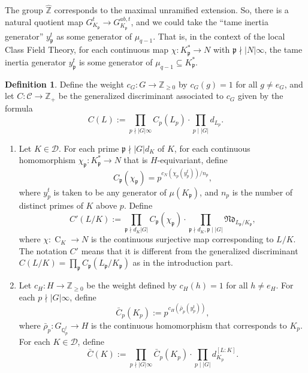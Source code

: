 \documentclass[12pt,a4paper]{amsart}
\numberwithin{equation}{section}%
\theoremstyle{plain}%
\theoremstyle{definition}%
\newtheorem{definition}[theorem]{Definition}%
\theoremstyle{remark}%
\begin{document}
    The group $\hat{\mathbb{Z}}$ corresponds to the maximal unramified extension.
    So, there is a natural quotient map $G_{K_{\mathfrak{p}}}^t\to G_{K_{\mathfrak{p}}}^{ab,t}$, and we could take the ``tame inertia generator'' $y_{\mathfrak{p}}^{t}$ as some generator of $\mu_{q-1}$.
    That is, in the context of the local Class Field Theory, for each continuous map $\chi:K_{\mathfrak{p}}^{*}\to N$ with $\mathfrak{p}\nmid\lvert N\rvert\infty$, the tame inertia generator $y_{\mathfrak{p}}^{t}$ is some generator of $\mu_{q-1}\subseteq K_{\mathfrak{p}}^{*}$.
    \begin{definition}\label{def: relative product of ramified primes}
    	Define the weight $c_{G}:G\to\mathbb{Z}_{\geq0}$ by $c_{G}(g)=1$ for all $g\neq e_{G}$, and let $C:\mathcal{C}\to\mathbb{Z}_{+}$ be the generalized discriminant associated to $c_{G}$ given by the formula
    	\begin{equation*}
    		C(L):=\prod_{p\nmid\lvert G\rvert\infty}C_{p}(L_{p})\cdot\prod_{p\mid\lvert G\rvert}d_{L_{p}}.
    	\end{equation*}
    	\begin{enumerate}
    		\item Let $K\in\mathcal{D}$.
    		For each prime $\mathfrak{p}\nmid\lvert G\rvert d_{K}$ of $K$, for each continuous homomorphism $\chi_{\mathfrak{p}}:K_{\mathfrak{p}}^{*}\to N$ that is $H$-equivariant, define
    		\begin{equation*}
    			C_{\mathfrak{p}}(\chi_{\mathfrak{p}})=p^{c_{N}(\chi_{p}(y_{p}^{t}))/n_{p}},
    		\end{equation*}
    		where $y_{p}^{t}$ is taken to be any generator of $\mu(K_{\mathfrak{p}})$, and $n_{p}$ is the number of distinct primes of $K$ above $p$.
    		Define
    		\begin{equation*}
    			C'(L/K):=\prod_{\mathfrak{p}\nmid d_{K}\lvert G\rvert}C_{\mathfrak{p}}(\chi_{\mathfrak{p}})
    			\cdot\prod_{\mathfrak{p}\nmid d_{K},\mathfrak{p}\mid\lvert G\rvert}\mathfrak{Nd}_{L_{\mathfrak{p}}/K_{\mathfrak{p}}},
    		\end{equation*}
    		where $\chi:\operatorname{C}_{K}\to N$ is the continuous surjective map corresponding to $L/K$.
    		The notation $C'$ means that it is different from the generalized discriminant $C(L/K)=\prod_{\mathfrak{p}}C_{\mathfrak{p}}(L_{\mathfrak{p}}/K_{\mathfrak{p}})$ as in the introduction part.
    		\item Let $c_{H}:H\to\mathbb{Z}_{\geq0}$ be the weight defined by $c_{H}(h)=1$ for all $h\neq e_{H}$.
    		For each $p\nmid\lvert G\rvert\infty$, define
    		\begin{equation*}
    			\bar{C}_{p}(K_{p}):=p^{c_{H}(\bar{\rho}_{p}(y_{p}^{t}))},
    		\end{equation*}
    		where $\bar{\rho}_{p}:G_{\mathbb{Q}_{p}^{t}}\to H$ is the continuous homomorphism that corresponds to $K_{p}$.
    		For each $K\in\mathcal{D}$, define
    		\begin{equation*}
    			\bar{C}(K):=\prod_{p\nmid\lvert G\rvert\infty}\bar{C}_{p}(K_{p})\cdot\prod_{p\mid\lvert G\rvert}d^{[L:K]}_{K_{p}}.
    		\end{equation*}
    	\end{enumerate}
    \end{definition}
\end{document}
